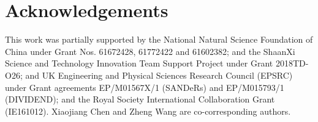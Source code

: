 \section{Acknowledgements}
This work was partially supported by the National Natural Science Foundation of China under Grant Nos. 61672428, 61772422 and 61602382; and the ShaanXi Science and Technology Innovation Team Support Project under Grant 2018TD-O26; and UK Engineering and Physical Sciences Research Council (EPSRC) under Grant agreements EP/M01567X/1 (SANDeRs) and EP/M015793/1 (DIVIDEND); and the Royal Society International Collaboration Grant (IE161012). Xiaojiang Chen and Zheng Wang are co-corresponding authors.
